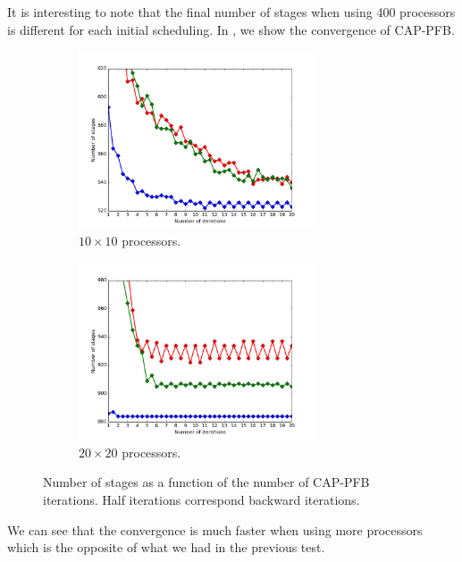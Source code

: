 \documentclass[letterpaper]{article}
\renewcommand{\(}{\left(}
\renewcommand{\)}{\right)}
\renewcommand{\[}{\left[}
\renewcommand{\]}{\right]}
\begin{document}
It is interesting to note that the final number of stages when using 400
processors is different for each initial scheduling. In ,
we show the convergence of CAP-PFB. 

\begin{figure}[H]
  \begin{subfigure}[b]{.5\textwidth}
    \centering
    \includegraphics[width=7cm]{convergence_band_20_20}
    \caption{$10\times 10$ processors.}
  \end{subfigure}
  \begin{subfigure}[b]{.5\textwidth}
    \centering
    \includegraphics[width=7cm]{convergence_band_40_40}
    \caption{$20\times 20$ processors.}
  \end{subfigure}
  \caption{Number of stages as a function of the number of CAP-PFB iterations.
  Half iterations correspond backward iterations.}
  \label{convergence_band}
\end{figure}
 
We can see that the convergence is much faster when using more processors which
is the opposite of what we had in the previous test.
\end{document}
